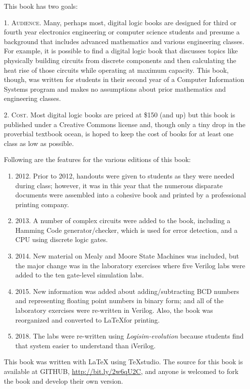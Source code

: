 This book has two goals:

1. \textsc{Audience}. Many, perhaps most, digital logic books are designed for third or fourth year electronics engineering or computer science students and presume a background that includes advanced mathematics and various engineering classes. For example, it is possible to find a digital logic book that discusses topics like physically building circuits from discrete components and then calculating the heat rise of those circuits while operating at maximum capacity. This book, though, was written for students in their second year of a Computer Information Systems program and makes no assumptions about prior mathematics and engineering classes.

2. \textsc{Cost}. Most digital logic books are priced at \$150 (and up) but this book is published under a Creative Commons license and, though only a tiny drop in the proverbial textbook ocean, is hoped to keep the cost of books for at least one class as low as possible.

Following are the features for the various editions of this book:

\begin{enumerate}
  \item 2012. Prior to 2012, handouts were given to students as they were needed during class; however, it was in this year that the numerous disparate documents were assembled into a cohesive book and printed by a professional printing company.
  \item 2013. A number of complex circuits were added to the book, including a Hamming Code generator/checker, which is used for error detection, and a \ac{CPU} using discrete logic gates.
  \item 2014. New material on Mealy and Moore State Machines was included, but the major change was in the laboratory exercises where five Verilog labs were added to the ten gate-level simulation labs.
  \item 2015. New information was added about adding/subtracting \ac{BCD} numbers and representing floating point numbers in binary form; and all of the laboratory exercises were re-written in Verilog. Also, the book was reorganized and converted to \LaTeX for printing.
  \item 2018. The labs were re-written using \textit{Logisim-evolution} because students find that system easier to understand than iVerilog.
\end{enumerate}

This book was written with \LaTeX \: using TeXstudio. The source for this book is available at GITHUB, \url{http://bit.ly/2w6qU2C}, and anyone is welcomed to fork the book and develop their own version. 

